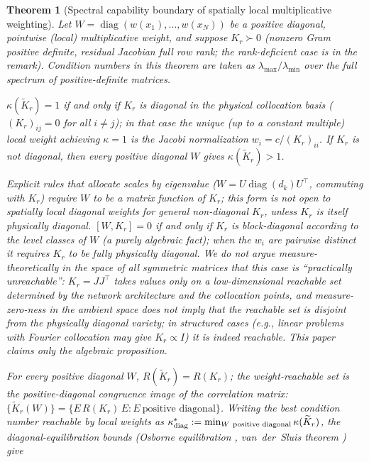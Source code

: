\documentclass[11pt]{article}
\newcommand{\W}{W}
\DeclareMathOperator{\diag}{diag}
\newtheorem{theorem}{Theorem}[section]
\numberwithin{equation}{section}
\begin{document}
\begin{theorem}[Spectral capability boundary of spatially local multiplicative weighting]\label{thm:local-cap}
Let $\W=\diag(w(x_1),\dots,w(x_N))$ be a positive diagonal, pointwise (local) multiplicative weight, and suppose $K_r\succ0$ (nonzero Gram positive definite, residual Jacobian full row rank; the rank-deficient case is in the remark). Condition numbers in this theorem are taken as $\lambda_{\max}/\lambda_{\min}$ over the full spectrum of positive-definite matrices.
\begin{description}[leftmargin=1.6em,itemsep=2pt]
\item[(i)~Necessary and sufficient condition for spectral whitening.] $\kappa(\widetilde K_r)=1$ if and only if $K_r$ is diagonal in the physical collocation basis ($(K_r)_{ij}=0$ for all $i\ne j$); in that case the unique (up to a constant multiple) local weight achieving $\kappa=1$ is the Jacobi normalization $w_i=c/(K_r)_{ii}$. If $K_r$ is not diagonal, then \emph{every} positive diagonal $\W$ gives $\kappa(\widetilde K_r)>1$.
\item[(ii)~Eigen-direction rotation is unreachable.] Explicit rules that allocate scales by eigenvalue ($\W=U\diag(d_k)U^\top$, commuting with $K_r$) require $\W$ to be a matrix function of $K_r$; this form is \emph{not open to spatially local diagonal weights} for general non-diagonal $K_r$, unless $K_r$ is itself physically diagonal. $[\W,K_r]=0$ if and only if $K_r$ is block-diagonal according to the level classes of $\W$ (a purely algebraic fact); when the $w_i$ are pairwise distinct it requires $K_r$ to be fully physically diagonal. We do \emph{not} argue measure-theoretically in the space of all symmetric matrices that this case is ``practically unreachable'': $K_r=JJ^\top$ takes values only on a low-dimensional \emph{reachable set} determined by the network architecture and the collocation points, and measure-zero-ness in the ambient space does not imply that the reachable set is disjoint from the physically diagonal variety; in structured cases (e.g., linear problems with Fourier collocation may give $K_r\propto I$) it is indeed reachable. This paper claims only the algebraic proposition.
\item[(iii)~The correlation-matrix invariant and the van der Sluis bound.] For \emph{every} positive diagonal $\W$, $R(\widetilde K_r)=R(K_r)$; the weight-reachable set is the positive-diagonal congruence image of the correlation matrix: $\{\widetilde K_r(\W)\}=\{E\,R(K_r)\,E:E\ \text{positive diagonal}\}$. Writing the best condition number reachable by local weights as $\kappa^*_{\rm diag}:=\min_{\W\ \text{positive diagonal}}\kappa(\widetilde K_r)$, the diagonal-equilibration bounds (Osborne equilibration \cite{Osborne1960}, van~der~Sluis theorem \cite{vanderSluis1969}) give

\end{description}
\end{theorem}
\end{document}
